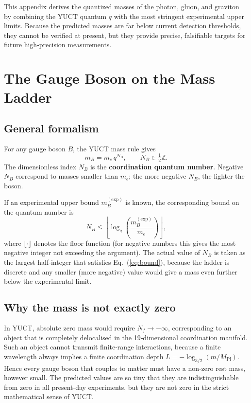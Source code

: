 \documentclass[12pt,a4paper]{article}
\newcommand{\Mpl}{M_{\mathrm{Pl}}}
\begin{document}
	This appendix derives the quantized masses of the photon, gluon, and graviton by combining the
	YUCT quantum $q$ with the most stringent experimental upper limits.  Because the predicted masses
	are far below current detection thresholds, they cannot be verified at present, but they provide
	precise, falsifiable targets for future high‑precision measurements.
	
	\section{The Gauge Boson on the Mass Ladder}
	
	\subsection{General formalism}
	
	For any gauge boson $B$, the YUCT mass rule gives
	\begin{equation}\label{eq:bosonmass}
		m_B = m_e \, q^{N_B}, \qquad N_B \in \tfrac12\mathbb{Z}.
	\end{equation}
	The dimensionless index $N_B$ is the \textbf{coordination quantum number}.  Negative $N_B$ correspond
	to masses smaller than $m_e$; the more negative $N_B$, the lighter the boson.
	
	If an experimental upper bound $m_B^{\mathrm{(exp)}}$ is known, the corresponding bound on the
	quantum number is
	\begin{equation}\label{eq:bound}
		N_B \le \left\lfloor \log_q\!\left( \frac{m_B^{\mathrm{(exp)}}}{m_e} \right) \right\rfloor ,
	\end{equation}
	where $\lfloor\cdot\rfloor$ denotes the floor function (for negative numbers this gives the
	most negative integer not exceeding the argument).  The actual value of $N_B$ is taken as the
	largest half‑integer that satisfies Eq.~(\ref{eq:bound}), because the ladder is discrete and
	any smaller (more negative) value would give a mass even further below the experimental limit.
	
	\subsection{Why the mass is not exactly zero}
	
	In YUCT, absolute zero mass would require $N_f \to -\infty$, corresponding to an object that
	is completely delocalised in the 19‑dimensional coordination manifold.  Such an object cannot
	transmit finite‑range interactions, because a finite wavelength always implies a finite
	coordination depth $L = -\log_{3/2}(m/\Mpl)$.  Hence every gauge boson that couples to
	matter must have a non‑zero rest mass, however small.  The predicted values are so tiny that
	they are indistinguishable from zero in all present‑day experiments, but they are not zero
	in the strict mathematical sense of YUCT.
	
\end{document}
